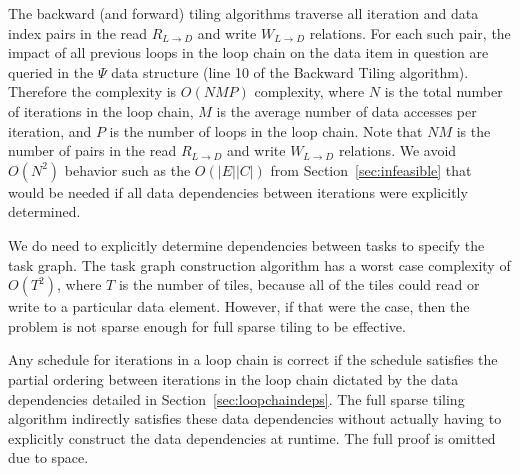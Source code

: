 The backward (and forward) tiling algorithms traverse
all iteration and data index pairs in the read $R_{L \rightarrow D}$
and write $W_{L \rightarrow D}$ relations.
For each such pair, the impact of all previous loops in the loop chain
on the data item in question are queried in the $\Psi$ data structure (line 10
of the Backward Tiling algorithm).
Therefore the complexity is $O(NMP)$ complexity, where $N$ is the total 
number of iterations in the loop chain,
$M$ is the average number of data accesses per iteration, and
$P$ is the number
of loops in the loop chain.
Note that $NM$ is the number of pairs in the read $R_{L \rightarrow D}$
and write $W_{L \rightarrow D}$ relations.
We
avoid $O(N^2)$ behavior such as the $O(|E| |C|)$ from Section~\ref{sec:infeasible}
that would be needed if all data dependencies between iterations were explicitly determined.

We do need to explicitly determine dependencies between tasks to specify the
task graph.
The task graph construction algorithm has a worst case complexity
of $O(T^2)$, where $T$ is the number of tiles, because
all of the tiles
could read or write to a particular data element.
However, if that were the case, then the problem is not sparse enough for full sparse tiling
to be effective.


Any schedule for iterations in a loop chain is correct if
the schedule satisfies the partial ordering between iterations
in the loop chain dictated by the data dependencies
detailed in Section~\ref{sec:loopchaindeps}.
The full sparse tiling algorithm indirectly satisfies these 
data dependencies without actually having to explicitly construct
the data dependencies at runtime.
The full proof is omitted due to space.


